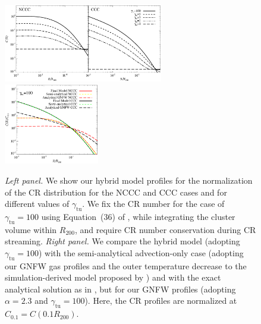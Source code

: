 \documentclass[traditabstract]{aa}
\newcommand{\rmn}{\mathrm}
\begin{document}
\begin{figure}[t]
\centering
\includegraphics[width=0.62\textwidth]{figures/CR_profiles_FinalModel.eps}
\includegraphics[width=0.37\textwidth]{figures/CR_profiles_FinalModelvsREX_norm0.1.eps}
\caption{\emph{Left panel.} We show our hybrid model profiles for the
  normalization of the CR distribution for the NCCC and CCC cases and for
  different values of $\gamma_{\rmn{tu}}$. We fix the CR number for the case of
  $\gamma_{\rmn{tu}}=100$ using Equation~(36) of \cite{2011A&A...527A..99E},
  while integrating the cluster volume within $R_{200}$, and require CR number
  conservation during CR streaming. \emph{Right panel.} We compare the
  hybrid model (adopting $\gamma_{\rmn{tu}}=100$) with the semi-analytical
  advection-only case (adopting our GNFW gas profiles and the outer temperature
  decrease to the simulation-derived model proposed by
  \citealp{2010MNRAS.409..449P}) and with the exact analytical solution as in
  \citet{2011A&A...527A..99E}, but for our GNFW profiles (adopting $\alpha=2.3$
  and $\gamma_{\rmn{tu}}=100$). Here, the CR profiles are normalized at
  $C_{0.1}=C(0.1R_{200})$.}
\label{fig:CRFinalModel}
\end{figure}
\end{document}
